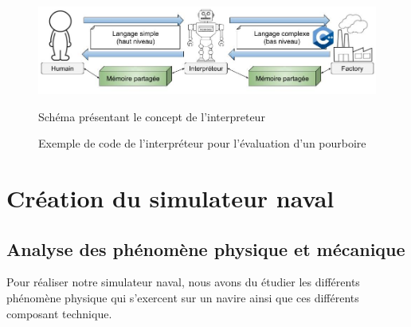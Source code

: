 \documentclass[a4paper,11pt]{article}
\begin{document}
    \begin{figure}[H]
        \begin{center}
            \caption{Schéma présentant le concept de l'interpreteur}
            \includegraphics[scale=0.5]{assets/Interpreteur_Dessin.jpg}
            \label{fig:interpreterDessin}
        \end{center}
    \end{figure}

    \begin{figure}[H]
        \begin{center}
            \caption{Exemple de code de l’interpréteur pour l’évaluation d'un pourboire}
            
            \label{fig:codeExemple}
        \end{center}
    \end{figure}

    \section{Création du simulateur naval}

    \subsection{Analyse des phénomène physique et mécanique}

    Pour réaliser notre simulateur naval, nous avons du étudier les différents phénomène physique qui s'exercent sur un navire ainsi que ces différents composant technique.
\end{document}
